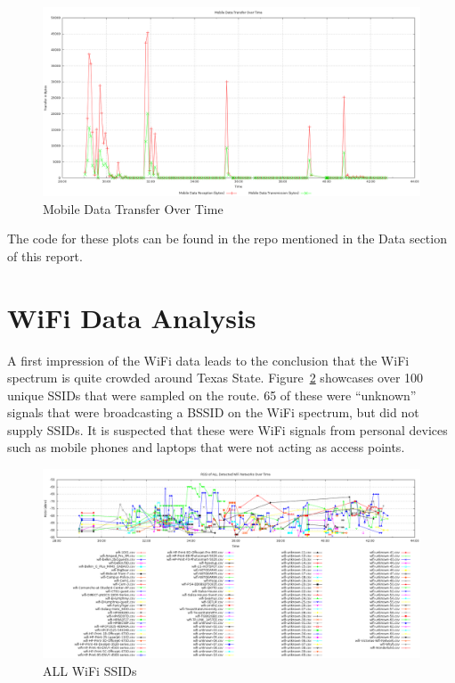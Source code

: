 \documentclass[journal,twocolumn]{IEEEtran}
\begin{document}
\begin{figure}
\begin{center}
\includegraphics[scale=0.3]{cell-data/cell-2.png}
\caption{Mobile Data Transfer Over Time}
\label{fig_cell_2}
\end{center}
\end{figure}

The code for these plots can be found in the repo mentioned in the Data 
section of this report.

\section{WiFi Data Analysis}

A first impression of the WiFi data leads to the conclusion that the 
WiFi spectrum is quite crowded around Texas State. Figure~\ref{fig_wifi_1}
showcases over 100 unique SSIDs that were sampled on the route. 65 of these 
were ``unknown'' signals that were broadcasting a BSSID on the WiFi spectrum, 
but did not supply SSIDs. It is suspected that these were WiFi signals 
from personal devices such as mobile phones and laptops that were not acting 
as access points.

\begin{figure}
\begin{center}
\includegraphics[scale=0.3]{wifi-data/001-everything.png}
\caption{ALL WiFi SSIDs}
\label{fig_wifi_1}
\end{center}
\end{figure}
\end{document}
